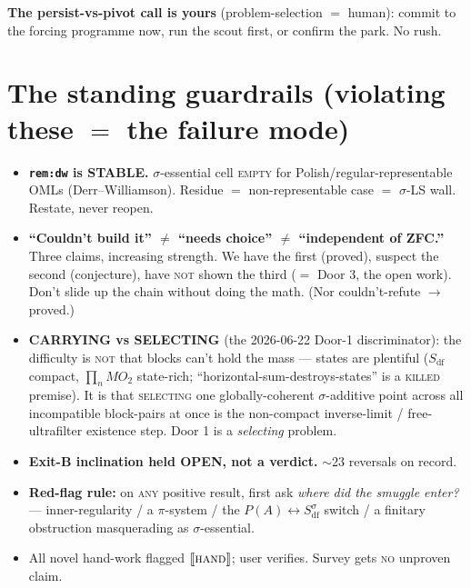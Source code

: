 \documentclass[9pt]{extarticle}
\newcommand{\Sdf}{S_{\mathrm{df}}}
\newcommand{\Sdfs}{S_{\mathrm{df}}^{\sigma}}
\newcommand{\hand}{\llbracket\textsc{hand}\rrbracket}
\newcommand{\remdw}{\texttt{rem:dw}}
\begin{document}
\textbf{The persist-vs-pivot call is yours} (problem-selection $=$ human): commit to the
forcing programme now, run the scout first, or confirm the park. No rush.

\section*{The standing guardrails (violating these $=$ the failure mode)}

\begin{itemize}[leftmargin=1.3em,topsep=1pt,itemsep=1pt]
  \item \textbf{\remdw{} is STABLE.} $\sigma$-essential cell \textsc{empty} for
        Polish/regular-representable OMLs (Derr--Williamson). Residue $=$
        non-representable case $=$ $\sigma$-LS wall. Restate, never reopen.
  \item \textbf{``Couldn't build it'' $\neq$ ``needs choice'' $\neq$ ``independent of
        ZFC.''} Three claims, increasing strength. We have the first (proved), suspect the
        second (conjecture), have \textsc{not} shown the third ($=$ Door 3, the open
        work). Don't slide up the chain without doing the math. (Nor couldn't-refute
        $\to$ proved.)
  \item \textbf{CARRYING vs SELECTING} (the 2026-06-22 Door-1 discriminator): the
        difficulty is \textsc{not} that blocks can't hold the mass --- states are
        plentiful ($\Sdf$ compact, $\prod_n MO_2$ state-rich;
        ``horizontal-sum-destroys-states'' is a \textsc{killed} premise). It is that
        \textsc{selecting} one globally-coherent $\sigma$-additive point across all
        incompatible block-pairs at once is the non-compact inverse-limit /
        free-ultrafilter existence step. Door 1 is a \emph{selecting} problem.
  \item \textbf{Exit-B inclination held OPEN, not a verdict.} $\sim$23 reversals on
        record.
  \item \textbf{Red-flag rule:} on \textsc{any} positive result, first ask \emph{where
        did the smuggle enter?} --- inner-regularity / a $\pi$-system / the
        $P(A)\leftrightarrow\Sdfs$ switch / a finitary obstruction masquerading as
        $\sigma$-essential.
  \item All novel hand-work flagged $\hand$; user verifies. Survey gets \textsc{no}
        unproven claim.
\end{itemize}
\end{document}
